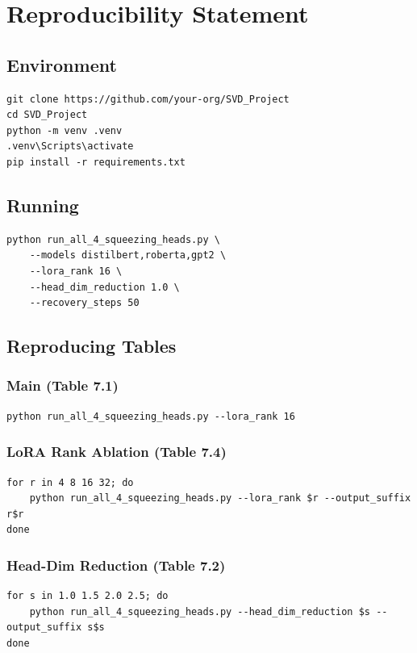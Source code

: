 
\section{Reproducibility Statement}

\subsection{Environment}

\begin{lstlisting}
git clone https://github.com/your-org/SVD_Project
cd SVD_Project
python -m venv .venv
.venv\Scripts\activate
pip install -r requirements.txt
\end{lstlisting}

\subsection{Running}

\begin{lstlisting}
python run_all_4_squeezing_heads.py \
    --models distilbert,roberta,gpt2 \
    --lora_rank 16 \
    --head_dim_reduction 1.0 \
    --recovery_steps 50
\end{lstlisting}

\subsection{Reproducing Tables}

\subsubsection{Main (Table 7.1)}
\begin{lstlisting}
python run_all_4_squeezing_heads.py --lora_rank 16
\end{lstlisting}

\subsubsection{LoRA Rank Ablation (Table 7.4)}
\begin{lstlisting}
for r in 4 8 16 32; do
    python run_all_4_squeezing_heads.py --lora_rank $r --output_suffix r$r
done
\end{lstlisting}

\subsubsection{Head-Dim Reduction (Table 7.2)}
\begin{lstlisting}
for s in 1.0 1.5 2.0 2.5; do
    python run_all_4_squeezing_heads.py --head_dim_reduction $s --output_suffix s$s
done
\end{lstlisting}

